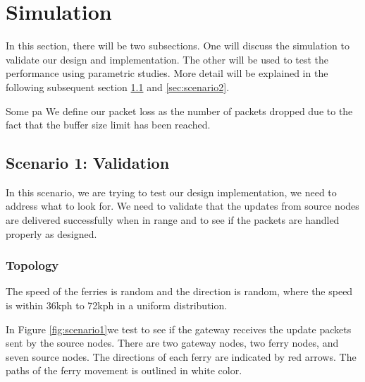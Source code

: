 \chapter{Simulation} 

In this section, there will be two subsections.  One will discuss the simulation to validate our design and implementation.  
The other will be used to test the performance using parametric studies.  
More detail will be explained in the following subsequent section \ref{sec:scenario1} and \ref{sec:scenario2}.

Some pa
We define our packet loss as the number of packets dropped due to the fact that the buffer size limit has been reached.



\section{Scenario 1: Validation}
\label{sec:scenario1}

In this scenario, we are trying to test our design implementation, we need to address what to look for.  
We need to validate that the updates from source nodes are delivered successfully when in range and to see if the packets are handled properly as designed.  

\subsection{Topology}

The speed of the ferries is random and the direction is random, where the speed is within 36kph to 72kph in a uniform distribution.  


In Figure \ref{fig:scenario1}we test to see if the gateway receives the update packets sent by the source nodes.  
There are two gateway nodes, two ferry nodes, and seven source nodes.  
The directions of each ferry are indicated by red arrows.
The paths of the ferry movement is outlined in white color.

